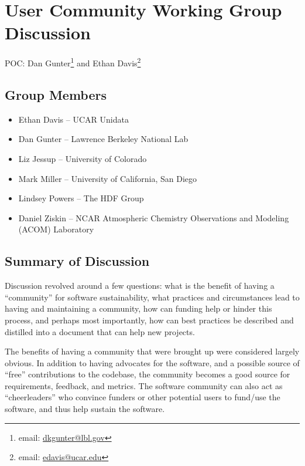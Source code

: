 \section{User Community Working Group Discussion}
\label{sec:appendix_user_community}

POC:
Dan Gunter\footnote{email: \href{mailto:dkgunter@lbl.gov}{dkgunter@lbl.gov}} and 
Ethan Davis\footnote{email: \href{mailto:edavis@ucar.edu}{edavis@ucar.edu}}

\subsection{Group Members}

\begin{itemize}
\item Ethan Davis -- UCAR Unidata
\item Dan Gunter -- Lawrence Berkeley National Lab
\item Liz Jessup -- University of Colorado
\item Mark Miller -- University of California, San Diego
\item Lindsey Powers -- The HDF Group
\item Daniel Ziskin -- NCAR Atmospheric Chemistry Observations and Modeling (ACOM) Laboratory
\end{itemize}

\subsection{Summary of Discussion}

Discussion revolved around a few questions: what is the benefit of having a
``community'' for software sustainability, what practices and circumstances lead
to having and maintaining a community, how can funding help or hinder this
process, and perhaps most importantly, how can best practices be described and
distilled into a document that can help new projects.

The benefits of having a community that were brought up were considered largely
obvious. In addition to having advocates for the software, and a possible source
of ``free'' contributions to the codebase, the community becomes a good source
for requirements, feedback, and metrics. The software community can also act as
``cheerleaders'' who convince funders or other potential users to fund/use the
software, and thus help sustain the software.

